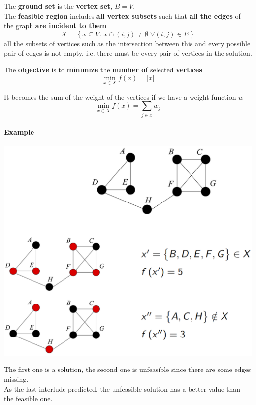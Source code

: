 The \textbf{ground set} is the \textbf{vertex set}, $B = V$.\\

The \textbf{feasible region} includes \textbf{all vertex subsets} such that \textbf{all the edges} of the graph \textbf{are incident to them}
$$ X = \left\{x \subseteq V : \, x \cap (i,j) \neq \emptyset \; \forall (i,j) \in E \right\}$$
all the subsets of vertices such as the intersection between this and every possible pair of edges is not empty, i.e. there must be every pair of vertices in the solution.

The \textbf{objective} is to \textbf{minimize} the \textbf{number of} selected \textbf{vertices}
$$ \min_{x \in X} f(x) = |x| $$

It becomes the sum of the weight of the vertices if we have a weight function $w$
$$ \min_{x \in X} f(x) = \sum_{j \in x} w_j $$

\newpage

\paragraph{Example}
\begin{center}
	\includegraphics[width=\columnwidth]{img/VCP1}
\end{center}
The first one is a solution, the second one is unfeasible since there are some edges missing.\\
As the last interlude predicted, the unfeasible solution has a better value than the feasible one.\\


